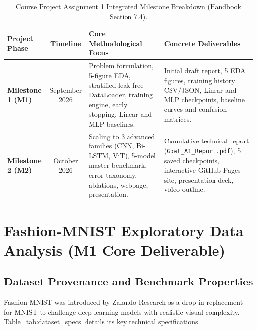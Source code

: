 \documentclass[11pt, a4paper]{article}
\begin{document}
\begin{table}[H]
  \centering
  \caption{Course Project Assignment 1 Integrated Milestone Breakdown (Handbook Section 7.4).}
  \label{tab:milestone_structure}
  \small
  \begin{tabularx}{\textwidth}{@{}p{3.2cm} c p{4.2cm} X@{}}
    \toprule
    \textbf{Project Phase} & \textbf{Timeline} & \textbf{Core Methodological Focus} & \textbf{Concrete Deliverables} \\
    \midrule
    \textbf{Milestone 1 (M1)} & September 2026 & Problem formulation, 5-figure EDA, stratified leak-free DataLoader, training engine, early stopping, Linear and MLP baselines. & Initial draft report, 5 EDA figures, training history CSV/JSON, Linear and MLP checkpoints, baseline curves and confusion matrices. \\
    \textbf{Milestone 2 (M2)} & October 2026 & Scaling to 3 advanced families (CNN, Bi-LSTM, ViT), 5-model master benchmark, error taxonomy, ablations, webpage, presentation. & Cumulative technical report (\texttt{Goat\_A1\_Report.pdf}), 5 saved checkpoints, interactive GitHub Pages site, presentation deck, video outline. \\
    \bottomrule
  \end{tabularx}
\end{table}

\section{Fashion-MNIST Exploratory Data Analysis (M1 Core Deliverable)}
\label{sec:eda}

\subsection{Dataset Provenance and Benchmark Properties}
Fashion-MNIST \cite{xiao2017fashionmnist} was introduced by Zalando Research as a drop-in replacement for MNIST to challenge deep learning models with realistic visual complexity. Table~\ref{tab:dataset_specs} details its key technical specifications.
\end{document}
